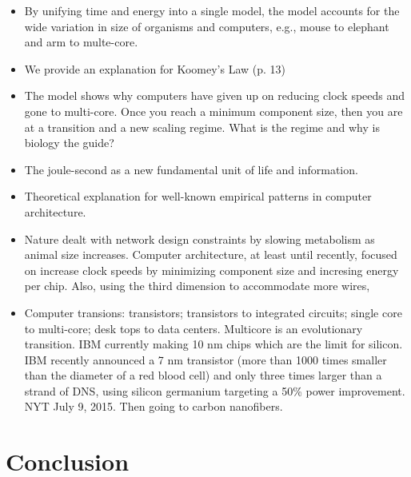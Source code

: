 \documentclass[12pt]{article}
\begin{document}
\begin{itemize} 
  
\item By unifying time and energy into a single model, the model accounts for
  the wide variation in size of organisms and computers, e.g., mouse to
  elephant and arm to multe-core.

\item We provide an explanation for Koomey's Law (p. 13)

\item The model shows why computers have given up on reducing clock speeds and
  gone to multi-core.  Once you reach a minimum component size, then you are at
  a transition and a new scaling regime.  What is the regime and why is biology
  the guide?

\item The joule-second as a new fundamental unit of life and information.

\item Theoretical explanation for well-known empirical patterns in computer
  architecture.

\item Nature dealt with network design constraints by slowing metabolism as
  animal size increases.  Computer architecture, at least until recently,
  focused on increase clock speeds by minimizing component size and incresing
  energy per chip.  Also, using the third dimension to accommodate more wires, 

\item Computer transions: transistors; transistors to integrated circuits;
  single core to multi-core; desk tops to data centers.  Multicore is an
  evolutionary transition.  IBM currently making 10 nm chips which are the
  limit for silicon.  IBM recently announced a 7 nm transistor (more than 1000
  times smaller than the diameter of a red blood cell) and only three times
  larger than a strand of DNS, using silicon germanium targeting a 50\% power
  improvement.  NYT July 9, 2015.  Then going to carbon nanofibers. 

\end{itemize}

\section{Conclusion}
\end{document}
